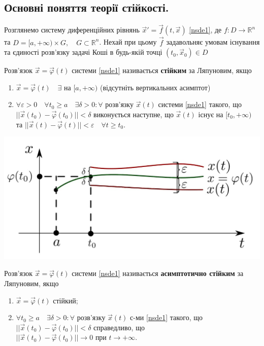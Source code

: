 \documentclass[14pt,a4paper]{scrartcl}
\theoremstyle{definition}
\theoremstyle{definition}
\theoremstyle{definition}
\begin{document}
\subsection{Основні поняття теорії стійкості.}
Розглянемо систему диференційних рівнянь $\overrightarrow{x}' = \overrightarrow{f}(t, \overrightarrow{x})$ \eqref{nsde1}, де $f : D \rightarrow \mathbb{R}^n$ та $D = [a, +\infty) \times G, \quad G \subset \mathbb{R}^n$. Нехай при цьому $\overrightarrow{f}$ задавольняє умовам існування та єдиності розв'язку задачі Коші в будь-якій точці $(t_0, \overrightarrow{x}_0) \in D$

\bd
Розв'язок $\overrightarrow{x} = \overrightarrow{\varphi}(t)$ системи \eqref{nsde1} називається \textbf{стійким} за Ляпуновим, якщо

\begin{enumerate}
  \item $\overrightarrow{x} = \overrightarrow{\varphi}(t) \quad \exists  \text{ на } [a, +\infty)$ (відсутніть вертикальних асимптот)
  \item $\forall \varepsilon > 0 \quad \forall t_0 \geq a \quad \exists \delta > 0 : \forall $ розв'язку $\overrightarrow{x}(t)$ системи \eqref{nsde1} такого, що $||\overrightarrow{x}(t_0) - \overrightarrow{\varphi}(t_0)|| < \delta$ виконується наступне, що $\overrightarrow{x}(t)$ існує на $[t_0, +\infty)$ та $||\overrightarrow{x}(t) - \overrightarrow{\varphi}(t)|| < \varepsilon \quad \forall t \geq t_0$.
\end{enumerate}
\ed

\begin{center} \includegraphics[scale=0.35]{assets/lect1.jpg} \end{center}

\bd
Розв'язок $\overrightarrow{x} = \overrightarrow{\varphi}(t)$ системи \eqref{nsde1} називається \textbf{асимптотично стійким} за Ляпуновим, якщо

\begin{enumerate}
  \item $\overrightarrow{x} = \overrightarrow{\varphi}(t)$ стійкий;
  \item $\forall t_0 \geq a \quad \exists \delta > 0: \forall$ розв'язку $\overrightarrow{x}(t)$ с-ми \eqref{nsde1} такого, що $||\overrightarrow{x}(t_0) - \overrightarrow{\varphi}(t_0)|| < \delta$ справедливо, що $||\overrightarrow{x}(t_0) - \overrightarrow{\varphi}(t_0)|| \rightarrow 0 \text{ при } t \rightarrow + \infty$.
\end{enumerate}
\end{document}
